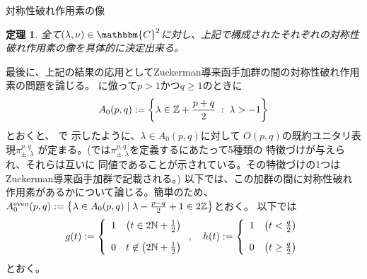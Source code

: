 \documentclass[notheorems]{beamer}
\newcommand{\nin}{\not\in}
\newtheorem{theorem}{定理}
\theoremstyle{definition}
\theoremstyle{example}
\theoremstyle{remark}
\theoremstyle{mystyle}
\begin{document}
\begin{frame}{対称性破れ作用素の像}
	\begin{theorem}
		全て$(\lambda, \nu) \in \mathbbm{C}^2$に対し、上記で構成されたそれぞれの対称性破れ作用素の像を具体的に決定出来る。
	\end{theorem}
\end{frame}
\begin{frame}{}
	最後に、上記の結果の応用としてZuckerman導来函手加群の間の対称性破れ作用素の問題を論じる。
	\cite[(5.1.1)]{KO2}に{倣}って$p>1${かつ}$q\ge1$のときに\begin{equation*}
	A_0(p,q):=\left\{ \lambda\in\mathbb{Z}+\frac{p+q}{2}\;:\;\lambda>-1 \right\}
\end{equation*}とおくと、
\cite{KO2}で
示したように、$\lambda\in A_0(p,q)$に対して
$O(p,q)$の既約ユニタリ表現$\pi_{\pm,\lambda}^{p,q}$
が定まる。(\cite{KO2}では$\pi_{\pm,\lambda}^{p,q}$を定義するにあたって5種類の
特徴づけが与えら{れ}、それらは互いに
同値であることが示されている。その特徴づけの1つは
Zuckerman導来函手加群で記載される。)
以下では、この加群の間に対称性破れ作用素がある{か}について論じる。簡単のため、$A_0^{\mbox{\scriptsize even}}(p,q):=\left\{ \lambda\in A_0(p,q)\mid \lambda-\frac{p-q}{2}+1\in2\mathbb{Z} \right\}$とおく。
以下では\begin{equation*}
	g(t):=\left\{ \begin{array}[]{ll}
		1&\left(t\in2\N+\frac{1}{2}  \right)\\[10pt]
		0&t\nin \left(2\N+\frac{1}{2}  \right)
	\end{array}\right.,\quad h(t):=\left\{ \begin{array}[]{ll}
		1&\left(  t<\frac{q}{2}\right)
		\\[10pt]
		0&\left( t\ge\frac{q}{2} \right)
\end{array}\right.
\end{equation*}とおく。
\end{frame}
\end{document}
